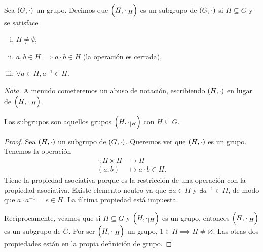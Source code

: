\begin{defi}[subgrupo]
    Sea $\left( G, \cdot \right)$ un grupo. Decimos que $\left( H, \cdot_{\mid H} \right)$ es un subgrupo de $\left( G, \cdot \right)$ si $H \subseteq G$ y se satisface
    \begin{enumerate}[i)]
        \item $H \neq \emptyset$,
        \item $a, b \in H \implies a\cdot b \in H$ (la operación es cerrada),
        \item $\forall a \in H, a^{-1} \in H$.
    \end{enumerate}
    \emph{Nota. } A menudo cometeremos un abuso de notación, escribiendo $\left( H, \cdot \right)$ en lugar de $\left( H, \cdot_{\mid H} \right)$.
\end{defi}

\begin{prop}
    Los subgrupos son aquellos grupos $\left( H, \cdot_{\mid H} \right)$ con $H\subseteq G$.
\end{prop}
\begin{proof}
    Sea $\left( H, \cdot \right)$ un subgrupo de $\left( G, \cdot \right)$. Queremos ver que $\left( H, \cdot \right)$ es un grupo.
    Tenemos la operación
    \[
        \begin{aligned}
            \cdot \colon H \times H &\to H \\
            (a, b) &\mapsto a\cdot b \in H.
        \end{aligned}
    \]
    Tiene la propiedad asociativa porque es la restricción de una operación con la propiedad asociativa.
    Existe elemento neutro ya que $\exists a \in H$ y $\exists a^{-1} \in H$, de modo que $a\cdot a^{-1}=e \in H$.
    La última propiedad está impuesta.
    
    Recíprocamente, veamos que si $H\subseteq G$ y $\left( H, \cdot_{\mid H} \right)$ es un grupo, entonces $\left( H, \cdot_{\mid H} \right)$ es un subgrupo de $G$. Por ser $\left( H, \cdot_{\mid H} \right)$ un grupo, $1\in H \implies H\neq\varnothing$. Las otras dos propiedades están en la propia definición de grupo.
\end{proof}

